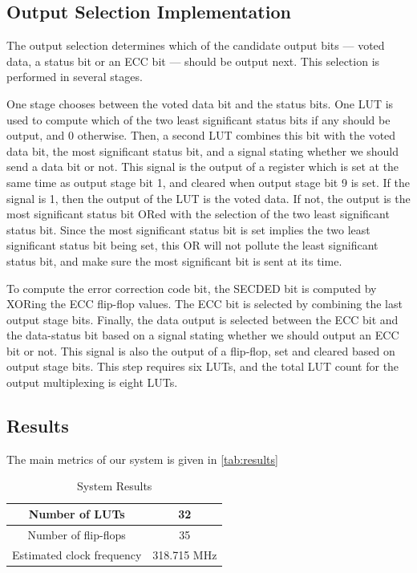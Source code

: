 \subsection{Output Selection Implementation}
The output selection determines which of the candidate output bits ---
voted data, a status bit or an ECC bit --- should be output next. This
selection is performed in several stages. 

One stage chooses between the voted data bit and the status bits. One
LUT is used to compute which of the two least significant status bits
if any should be output, and 0 otherwise. Then, a second LUT combines
this bit with the voted data bit, the most significant status bit, and
a signal stating whether we should send a data bit or not. This signal
is the output of a register which is set at the same time as output
stage bit 1, and cleared when output stage bit 9 is set. If the signal
is 1, then the output of the LUT is the voted data. If not, the output
is the most significant status bit ORed with the selection of the two
least significant status bit. Since the most significant status bit is
set implies the two least significant status bit being set, this OR
will not pollute the least significant status bit, and make sure the
most significant bit is sent at its time.

To compute the error correction code bit, the SECDED bit is computed
by XORing the ECC flip-flop values. The ECC bit is selected by
combining the last output stage bits. Finally, the data output is
selected between the ECC bit and the data-status bit based on a signal
stating whether we should output an ECC bit or not. This signal is
also the output of a flip-flop, set and cleared based on output stage
bits. This step requires six LUTs, and the total LUT count for the
output multiplexing is eight LUTs. 

\subsection{Results}

The main metrics of our system is given in \autoref{tab:results}

\begin{table}[htbp]
  \centering
  \begin{tabular}{|c|c|}
    \hline
    Number of LUTs & 32 \\ \hline
    Number of flip-flops & 35 \\ \hline
    Estimated clock frequency & 318.715 MHz \\ \hline
  \end{tabular}
  \caption{System Results}
  \label{tab:results}
\end{table}
